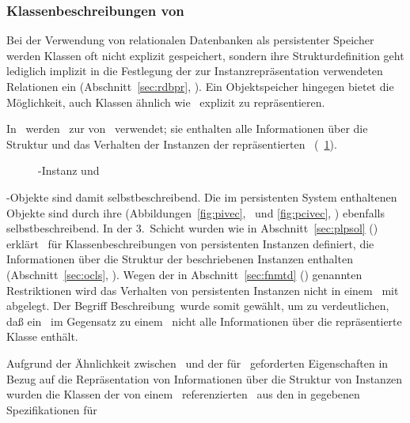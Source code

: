 \subsubsection{Klassenbeschreibungen von
\protect\clos\ \protect\cls[n]}%
\label{sec:mopdescr}%
%
Bei der Verwendung von relationalen Datenbanken als persistenter
Speicher werden Klassen oft nicht explizit gespeichert, sondern ihre
Strukturdefinition geht lediglich implizit in die Festlegung der zur
Instanzrepr\"{a}sentation verwendeten Relationen ein
(Abschnitt~\ref{sec:rdbpr}, \citepage{\pageref{sec:rdbpr}}). Ein
Objektspeicher hingegen bietet die M\"{o}glichkeit, auch Klassen
\"{a}hn\-lich wie \clsmo[e]\ explizit zu repr\"{a}sentieren.
%
\par{}In \clos\ werden \clsmo[e]\ zur \representation{} von
\cls[n]\ verwendet; sie enthalten alle Informationen \"{u}ber die
Struktur und das Verhalten der Instanzen der repr\"{a}sentierten
\cls\ (\figurename~\ref{fig:clicmc}).
%
\begin{figure}[htbp]%
\ifbuch%
\centerline{}%
\else%
\centerline{}%
\fi%
\caption{\protect\clos-Instanz und \protect\clsmo}\label{fig:clicmc}%
\end{figure}%
%
\clos-Objekte sind damit selbstbeschreibend.
Die im persistenten System enthaltenen Objekte sind durch ihre
\representationform{} (Abbildungen~\ref{fig:pivec},
\citepage{\pageref{fig:pivec}}\ und \ref{fig:pcivec},
\citepage{\pageref{fig:pcivec}}) ebenfalls selbstbeschreibend.
In der 3.~Schicht wurden wie in Abschnitt~\ref{sec:plpsol}
(\citepage{\pageref{sec:plpsol}}) erkl\"{a}rt \clsdc[n]\ f\"{u}r
Klassenbeschreibungen von persistenten Instanzen definiert, die
Informationen \"{u}ber die Struktur
der beschriebenen Instanzen enthalten (Abschnitt~\ref{sec:ocls},
\citepage{\pageref{sec:ocls}}). Wegen der in Abschnitt~\ref{sec:fnmtd}
(\citepage{\pageref{sec:fnmtd}}) genannten Restriktionen wird das
Verhalten von persistenten Instanzen nicht in einem \clsdo\ mit
abgelegt. Der Begriff \rglq{}Beschreibung\rgrq\ wurde
somit gew\"{a}hlt, um zu verdeutlichen, da\ss{} ein \clsdo\ im Gegensatz zu
einem \clsmo\ nicht alle Informationen \"{u}ber die repr\"{a}sentierte
Klasse enth\"{a}lt.
%
\par{}Aufgrund der \"{A}hnlichkeit zwischen \clsmo[en]\ und der f\"{u}r
\clsdo[e]\ geforderten Eigenschaften in Bezug auf die Repr\"{a}sentation
von Informationen \"{u}ber die Struktur von Instanzen wurden die Klassen
der von einem \clsdo\ referenzierten \deo[e]\ aus den in
\cite{bib:amop91} gegebenen Spezifikationen f\"{u}r
